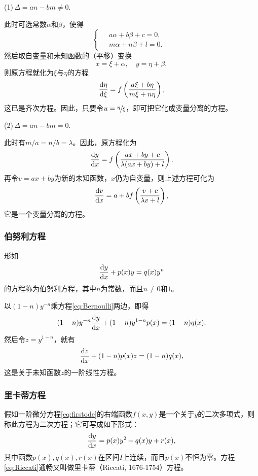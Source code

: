 (1)\quad $\,\Delta=an-bm\neq 0.$

此时可选常数$\alpha$和$\beta$，使得
\[
\begin{cases}
\quad a\alpha+b\beta+c=0, &\\
\quad m\alpha+n\beta+l=0.
\end{cases}
\]
然后取自变量和未知函数的（平移）变换
\[
x=\xi+\alpha,\quad y=\eta+\beta,
\]
则原方程就化为$\xi$与$\eta$的方程
\[
\frac{\mathrm{d}{}\eta}{\mathrm{d}{}\xi}=f\left(\frac{a\xi+b\eta}{m\xi+n\eta}\right),
\]
这已是齐次方程。因此，只要令$u=\sfrac{\eta}{\xi}$，即可把它化成变量分离的方程。

(2)\quad $\,\Delta=an-bm=0.$

此时有$m/a=n/b=\lambda$。因此，原方程化为
\[
\frac{\mathrm{d}{}y}{\mathrm{d}{}x}=f\left(\frac{ax+by+c}{\lambda(ax+by)+l}\right).
\]
再令$v=ax+by$为新的未知函数，$x$仍为自变量，则上述方程可化为
\[
\frac{\mathrm{d}{}v}{\mathrm{d}{}x}=a+bf\left(\frac{v+c}{\lambda v+l}\right),
\]
它是一个变量分离的方程。

\subsubsection{伯努利方程}
\begin{defn}\label{def:eq:Bernoulli}
形如
\begin{equation}\label{eq:Bernoulli}
\frac{\mathrm{d}{}y}{\mathrm{d}{}x}+p(x)y=q(x)y^n
\end{equation}
的方程称为伯努利方程，其中$n$为常数，而且$n\neq 0$和$1$。
\end{defn}

以$(1-n)y^{-n}$乘方程\eqref{eq:Bernoulli}两边，即得
\[
(1-n)y^{-n}\frac{\mathrm{d}{}y}{\mathrm{d}{}x}+(1-n)y^{1-n}p(x)=(1-n)q(x).
\]
然后令$z=y^{1-n}$，就有
\[
\frac{\mathrm{d}{}z}{\mathrm{d}{}x}+(1-n)p(x)z=(1-n)q(x),
\]
这是关于未知函数$z$的一阶线性方程。

\subsubsection{里卡蒂方程}
\begin{defn}\label{def:eq:Riccati}
假如一阶微分方程\eqref{eq:firstode}的右端函数$f(x,y)$是一个关于$y$的二次多项式，则称此方程为二次方程；它可写成如下形式：
\begin{equation}\label{eq:Riccati}
\frac{\mathrm{d}{}y}{\mathrm{d}{}x}=p(x)y^2+q(x)y+r(x),
\end{equation}
其中函数$p(x),q(x),r(x)$在区间$I$上连续，而且$p(x)$不恒为零。方程\eqref{eq:Riccati}通畅又叫做里卡蒂（Riccati, 1676-1754）方程。
\end{defn}

